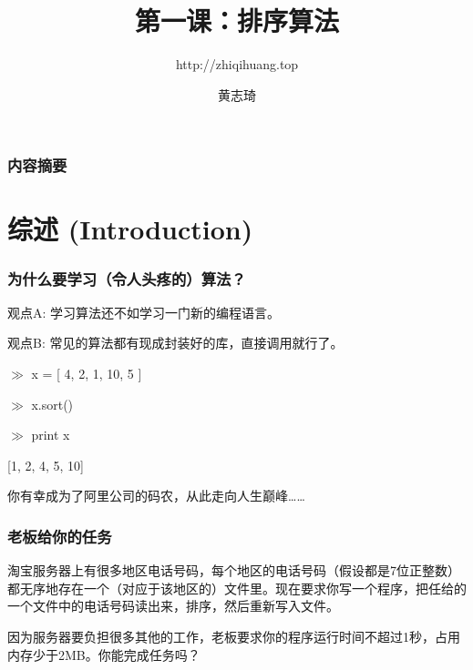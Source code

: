 \documentclass[CJK,14pt]{beamer}
\begin{document}
\bch

\title{第一课：排序算法}
\subtitle{http://zhiqihuang.top}
  \author{黄志琦}
  \date{}

  \maketitle

  \begin{frame}
    \frametitle{内容摘要}
  \tableofcontents
  \end{frame}

  \section{综述 (Introduction)}

  \begin{frame}
\frametitle{为什么要学习（令人头疼的）算法？}


    
  \end{frame}

  
  \begin{frame}
    \bitem
  \item{观点A: 学习算法还不如学习一门新的编程语言。}
    \eitem

  \end{frame}
  
  
  \begin{frame}
    \bitem
  \item{观点B: 常见的算法都有现成封装好的库，直接调用就行了。}
    \eitem

{\color{violet}
    $\gg$ x = [ 4, 2, 1, 10, 5 ]
    
    $\gg$ x.sort()
    
    $\gg$  print x

  [1, 2, 4, 5, 10]
}

    
  \end{frame}


  \begin{frame}
    你有幸成为了阿里公司的码农，从此走向人生巅峰……

  \end{frame}

  \begin{frame}
\frametitle{老板给你的任务}
    淘宝服务器上有很多地区电话号码，每个地区的电话号码（假设都是7位正整数）都无序地存在一个（对应于该地区的）文件里。现在要求你写一个程序，把任给的一个文件中的电话号码读出来，排序，然后重新写入文件。

    因为服务器要负担很多其他的工作，老板要求你的程序运行时间不超过1秒，占用内存少于2MB。你能完成任务吗？
    
  \end{frame}
\end{document}
